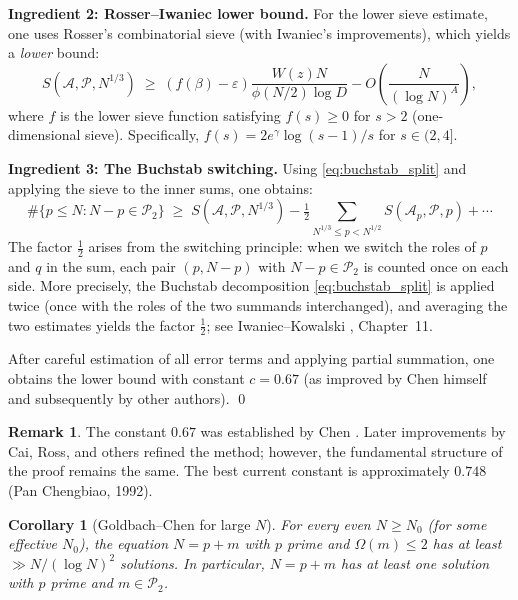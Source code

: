 \documentclass[12pt,a4paper]{amsart}
\newtheorem{corollary}[theorem]{Corollary}
\theoremstyle{definition}
\newtheorem{remark}[theorem]{Remark}
\newcommand{\Ptwo}{\mathcal{P}_2}
\newcommand{\OOmega}{\Omega}   %
\begin{document}
\textbf{Ingredient 2: Rosser--Iwaniec lower bound.}
For the lower sieve estimate, one uses Rosser's combinatorial sieve
(with Iwaniec's improvements), which yields a \emph{lower} bound:
\[
  S(\mathcal{A}, \mathcal{P}, N^{1/3})
  \;\geq\;
  (f(\beta) - \varepsilon)\frac{W(z)N}{\phi(N/2)\log D}
  - O\!\left(\frac{N}{(\log N)^A}\right),
\]
where $f$ is the lower sieve function satisfying $f(s) \geq 0$ for $s > 2$
(one-dimensional sieve).  Specifically, $f(s) = 2e^\gamma \log(s-1)/s$ for
$s \in (2, 4]$.

\textbf{Ingredient 3: The Buchstab switching.}
Using \eqref{eq:buchstab_split} and applying the sieve to the inner sums,
one obtains:
\begin{equation}\label{eq:chen_key}
  \#\{p \leq N : N-p \in \Ptwo\}
  \;\geq\;
  S(\mathcal{A}, \mathcal{P}, N^{1/3})
  - \tfrac{1}{2}\sum_{N^{1/3} \leq p < N^{1/2}} S(\mathcal{A}_p, \mathcal{P}, p) + \cdots
\end{equation}
The factor $\tfrac{1}{2}$ arises from the switching principle: when we switch
the roles of $p$ and $q$ in the sum, each pair $(p, N-p)$ with $N-p \in \Ptwo$
is counted once on each side.  More precisely, the Buchstab decomposition
\eqref{eq:buchstab_split} is applied twice (once with the roles of the two
summands interchanged), and averaging the two estimates yields the factor
$\tfrac{1}{2}$; see Iwaniec--Kowalski \cite{IwaniecKowalski2004}, Chapter~11.

After careful estimation of all error terms and applying partial summation,
one obtains the lower bound with constant $c = 0.67$ (as improved by
Chen himself and subsequently by other authors).  \qed

\begin{remark}
  The constant $0.67$ was established by Chen \cite{Chen1973}.
  Later improvements by Cai, Ross, and others refined the method;
  however, the fundamental structure of the proof remains the same.
  The best current constant is approximately $0.748$ (Pan Chengbiao, 1992).
\end{remark}

\begin{corollary}[Goldbach--Chen for large $N$]\label{cor:goldbach_chen}
  For every even $N \geq N_0$ (for some effective $N_0$), the equation
  $N = p + m$ with $p$ prime and $\OOmega(m) \leq 2$ has at least
  $\gg N/(\log N)^2$ solutions.  In particular, $N = p + m$ has at least
  one solution with $p$ prime and $m \in \Ptwo$.
\end{corollary}
\end{document}
